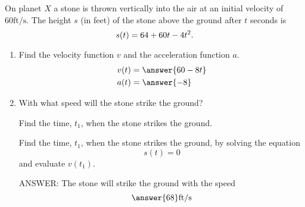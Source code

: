 \documentclass{ximera}
\author{Nela Lakos}
\begin{document}
\begin{exercise}
On planet $X$ a stone is thrown vertically into the air at an initial velocity of $60\mathrm{ft/s}$. The height $s$ (in feet) of the stone above the ground after $t$ seconds is
\[
s(t)=64+60t-4t^2\ldotp
\]
\begin{enumerate}
\item Find the velocity function $v$ and the acceleration function $a$. 
\begin{align*}
v(t)&=\answer{60-8t}\\
a(t)&=\answer{-8}
\end{align*}
\item With what speed will the stone strike the ground? 
\begin{hint}
Find the time, $t_{1}$, when the stone strikes the ground.
\end{hint}
\begin{hint}
Find the time, $t_{1}$, when the stone strikes the ground, by solving the equation
\[
s(t)=0
\]
and evaluate  $v(t_{1})$.

\end{hint}
ANSWER: The stone will strike the ground with the speed
\[\answer{68}\mathrm{ft/s}\] %
\end{enumerate}





\end{exercise}
\end{document}
